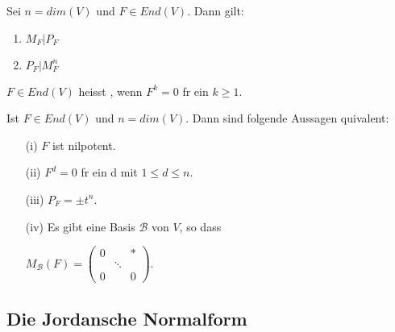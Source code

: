 \documentclass[9pt, a4paper, twocolumn, landscape]{article}
\begin{document}
\begin{theorem}
Sei $n = dim (V)$ und $F \in End(V)$. Dann gilt:
\begin{enumerate}
\item $M_F | P_F$
\item $P_F | M_F^n$
\end{enumerate}
\end{theorem}
\begin{definition}
$F \in End(V)$ heisst , wenn $F^k = 0$ f\uee r ein $k \geq 1$.
\end{definition}
\begin{theorem}
Ist $F \in End(V)$ und $n = dim(V)$. Dann sind folgende Aussagen \aee quivalent:
\begin{itemize}
\item[(i)] $F$ ist nilpotent.
\item[(ii)] $F^d = 0$ f\uee r ein d mit $1 \leq d \leq n$.
\item[(iii)] $P_F = \pm t^n$.
\item[(iv)] Es gibt eine Basis $\mathcal{B}$ von $V$, so dass 
\\ \centerline{
$M_{\mathcal{B}}(F)=\left(\begin{array}{ccc}
{0} & {} & {*} \\ {} & {\ddots} & {} 
\\ {0} & {} & {0}\end{array}\right)$.
}
\end{itemize}
\end{theorem}

\subsection{Die Jordansche Normalform}
\end{document}
